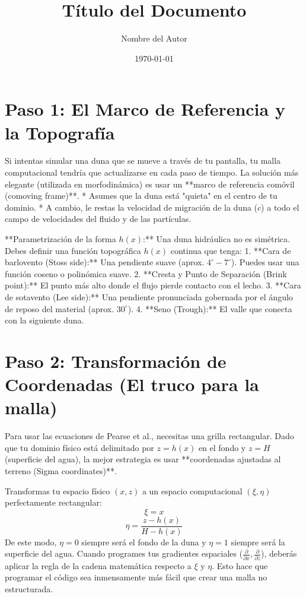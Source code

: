 \documentclass[11pt,a4paper]{article}
\title{\textbf{Título del Documento}}
\author{Nombre del Autor}
\date{\today}
\begin{document}
\maketitle

\tableofcontents
\newpage

\section{Paso 1: El Marco de Referencia y la Topografía}
Si intentas simular una duna que se mueve a través de tu pantalla, tu malla computacional tendría que actualizarse en cada paso de tiempo. La solución más elegante (utilizada en morfodinámica) es usar un **marco de referencia comóvil (comoving frame)**. 
*   Asumes que la duna está "quieta" en el centro de tu dominio.
*   A cambio, le restas la velocidad de migración de la duna ($c$) a todo el campo de velocidades del fluido y de las partículas.

**Parametrización de la forma $h(x)$:**
Una duna hidráulica no es simétrica. Debes definir una función topográfica $h(x)$ continua que tenga:
1.  **Cara de barlovento (Stoss side):** Una pendiente suave (aprox. $4^\circ - 7^\circ$). Puedes usar una función coseno o polinómica suave.
2.  **Cresta y Punto de Separación (Brink point):** El punto más alto donde el flujo pierde contacto con el lecho.
3.  **Cara de sotavento (Lee side):** Una pendiente pronunciada gobernada por el ángulo de reposo del material (aprox. $30^\circ$).
4.  **Seno (Trough):** El valle que conecta con la siguiente duna.

\section{Paso 2: Transformación de Coordenadas (El truco para la malla)}
Para usar las ecuaciones de Pearse et al., necesitas una grilla rectangular. Dado que tu dominio físico está delimitado por $z = h(x)$ en el fondo y $z = H$ (superficie del agua), la mejor estrategia es usar **coordenadas ajustadas al terreno (Sigma coordinates)**.

Transformas tu espacio físico $(x, z)$ a un espacio computacional $(\xi, \eta)$ perfectamente rectangular:
$$ \xi = x $$
$$ \eta = \frac{z - h(x)}{H - h(x)} $$
De este modo, $\eta = 0$ siempre será el fondo de la duna y $\eta = 1$ siempre será la superficie del agua. Cuando programes tus gradientes espaciales ($\frac{\partial}{\partial x}, \frac{\partial}{\partial z}$), deberás aplicar la regla de la cadena matemática respecto a $\xi$ y $\eta$. Esto hace que programar el código sea inmensamente más fácil que crear una malla no estructurada.
\end{document}
